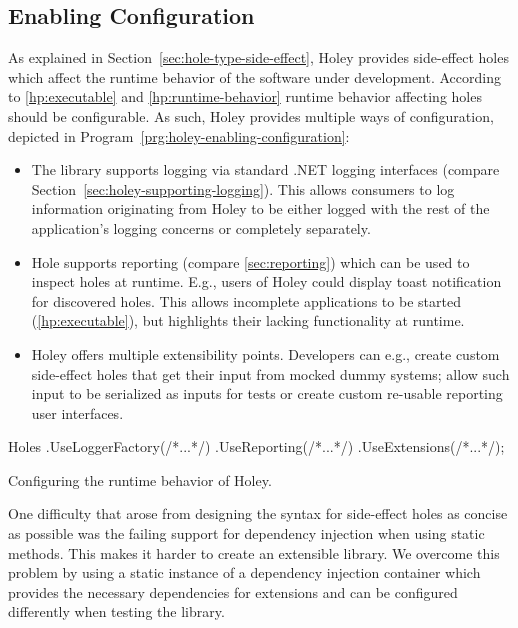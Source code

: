 \subsection{Enabling Configuration}
\label{sec:holey-enabling-configuration}
As explained in Section~\ref{sec:hole-type-side-effect}, Holey provides side-effect holes which affect the runtime behavior of the software under development.
According to \ref{hp:executable} and \ref{hp:runtime-behavior} runtime behavior affecting holes should be configurable.
As such, Holey provides multiple ways of configuration, depicted in Program~\ref{prg:holey-enabling-configuration}:
\begin{itemize}
    \item The library supports logging via standard .NET logging interfaces (compare Section~\ref{sec:holey-supporting-logging}). This allows consumers to log information originating from Holey to be either logged with the rest of the application's logging concerns or completely separately.
    \item Hole supports reporting (compare \ref{sec:reporting}) which can be used to inspect holes at runtime. E.g., users of Holey could display toast notification for discovered holes. This allows incomplete applications to be started (\ref{hp:executable}), but highlights their lacking functionality at runtime.
    \item Holey offers multiple extensibility points. Developers can e.g., create custom side-effect holes that get their input from mocked dummy systems; allow such input to be serialized as inputs for tests or create custom re-usable reporting user interfaces.
\end{itemize}

\begin{program}[ht]
\begin{CsCode}
Holes
	.UseLoggerFactory(/*...*/)
	.UseReporting(/*...*/)
	.UseExtensions(/*...*/);
\end{CsCode}
\caption{Configuring the runtime behavior of Holey.}
\label{prg:holey-enabling-configuration}
\end{program}

One difficulty that arose from designing the syntax for side-effect holes as concise as possible was the failing support for dependency injection when using static methods.
This makes it harder to create an extensible library.
We overcome this problem by using a static instance of a dependency injection container which provides the necessary dependencies for extensions and can be configured differently when testing the library.

